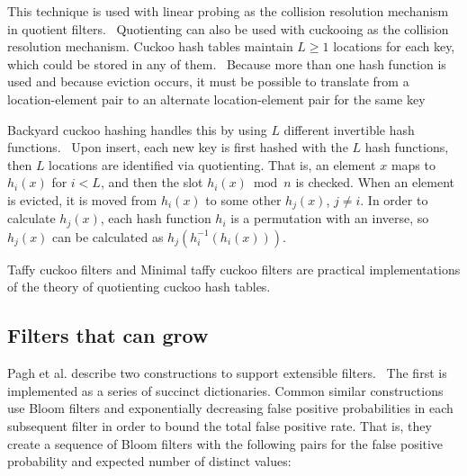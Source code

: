 \documentclass[sigconf, nonacm]{acmart}
\newcommand{\etal}{et al.}
\begin{document}
This technique is used with linear probing as the collision resolution mechanism in quotient filters.~\cite{quotient-filter}
Quotienting can also be used with cuckooing as the collision resolution mechanism.
Cuckoo hash tables maintain $L \ge 1$ locations for each key, which could be stored in any of them.~\cite{cuckoo-journal}
Because more than one hash function is used and because eviction occurs, it must be possible to translate from a location-element pair to an alternate location-element pair for the same key



Backyard cuckoo hashing handles this by using $L$ different invertible hash functions.~\cite{backyard}
Upon insert, each new key is first hashed with the $L$ hash functions, then $L$ locations are identified via quotienting.
That is, an element $x$ maps to $h_i(x)$ for $i < L$, and then the slot $h_i(x) \bmod n$ is checked.
When an element is evicted, it is moved from $h_i(x)$ to some other $h_j(x)$, $j \ne i$.
In order to calculate $h_j(x)$, each hash function $h_i$ is a permutation with an inverse, so $h_j(x)$ can be calculated as $h_j(h_i^{-1}(h_i(x)))$.

Taffy cuckoo filters and Minimal taffy cuckoo filters are practical implementations of the theory of quotienting cuckoo hash tables.


\subsection{Filters that can grow}

Pagh \etal{} describe two constructions to support extensible filters.~\cite{psw}
The first is implemented as a series of succinct dictionaries.
Common similar constructions use Bloom filters and exponentially decreasing false positive probabilities in each subsequent filter in order to bound the total false positive rate.
That is, they create a sequence of Bloom filters with the following pairs for the false positive probability and expected number of distinct values:
\end{document}
